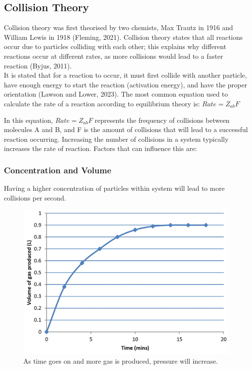 \subsection{Collision Theory}
Collision theory was first theorised by two chemists, Max Trautz in 1916 and William Lewis in 1918 (Fleming, 2021). Collision theory states that all reactions occur due to particles colliding with each other; this explains why different reactions occur at different rates, as more collisions would lead to a faster reaction (Byjus, 2011). \\
It is stated that for a reaction to occur, it must first collide with another particle, have enough energy to start the reaction (activation energy), and have the proper orientation (Lawson and Lower, 2023).
The most common equation used to calculate the rate of a reaction according to equilibrium theory is: 
\begin{math} Rate = Z_{ab}F \end{math}

In this equation, \begin{math} Rate = Z_{ab}F \end{math} represents the frequency of collisions between molecules A and B, and F is the amount of collisions that will lead to a successful reaction occurring.
Increasing the number of collisions in a system typically increases the rate of reaction. Factors that can influence this are: \\

\subsubsection{Concentration and Volume}
Having a higher concentration of particles within system will lead to more collisions per second. \\

\begin{figure}
    \centering
    \includegraphics[width=1\linewidth]{assets/1.jpg}
    \caption{As time goes on and more gas is produced, pressure will increase.}
    \label{fig:enter-label}
\end{figure}

